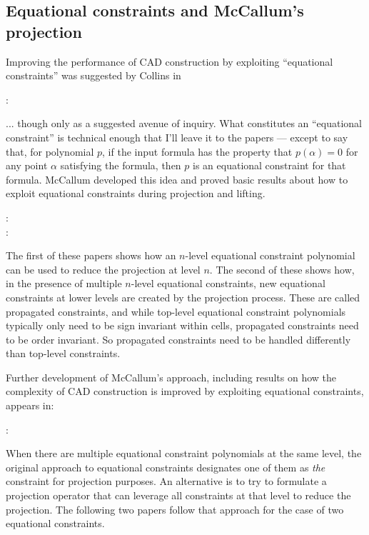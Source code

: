 \documentclass{article}
\begin{document}
\subsection{Equational constraints and McCallum's projection}
Improving the performance of CAD construction by exploiting
``equational constraints'' was suggested by Collins in
%
\begin{description}
\item[\autocite{Collins:94} :]  
\end{description}
%
... though only as a suggested avenue of inquiry. What constitutes an
``equational constraint'' is technical enough that I'll leave it to
the papers --- except to say that, for polynomial $p$,  if the input formula has the
property that $p(\alpha) = 0$ for any point $\alpha$ satisfying the
formula, then $p$ is an equational constraint for that formula.
McCallum developed this idea
and proved basic results about how to exploit equational constraints
during projection and lifting.
%
\begin{description}
\item[\autocite{McCallum:99} :]  
\item[\autocite{McCallum:01} :]  
\end{description}
%
The first of these papers shows how an $n$-level equational constraint
polynomial can be used to reduce the projection at level $n$.
The second of these shows how, in the presence of multiple
$n$-level equational constraints, new equational constraints at lower
levels are created by the projection process.  These are called
propagated constraints, and while top-level equational constraint
polynomials typically only need to be sign invariant within cells,
propagated constraints need to be order invariant.  So propagated
constraints need to be handled differently than top-level constraints. 

Further development of McCallum's  approach, including results on
how the complexity of CAD construction is improved by exploiting
equational constraints, appears in:
%
\begin{description}
\item[\autocite{EnglandEtAl:2020} :]  
\end{description}
%

When there are multiple equational constraint polynomials at the same
level, the original approach to equational constraints designates one
of them as \emph{the} constraint for projection purposes.  An
alternative is to try to formulate a projection operator that can
leverage all constraints at that level to reduce the projection.
The following two papers follow that approach for the case of two
equational constraints.
\end{document}
